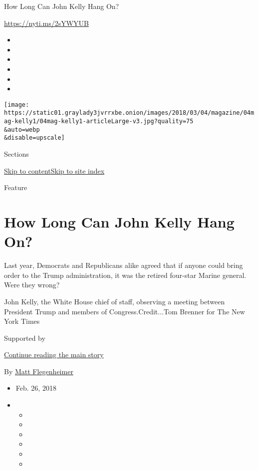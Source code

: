 How Long Can John Kelly Hang On?

\url{https://nyti.ms/2sYWYUB}

\begin{itemize}
\item
\item
\item
\item
\item
\item
\end{itemize}

\texttt{[image: https://static01.graylady3jvrrxbe.onion/images/2018/03/04/magazine/04mag-kelly1/04mag-kelly1-articleLarge-v3.jpg?quality=75\\\&auto=webp\\\&disable=upscale]}

Sections

\protect\hyperlink{site-content}{Skip to
content}\protect\hyperlink{site-index}{Skip to site index}

Feature

\hypertarget{how-long-can-john-kelly-hang-on}{%
\section{How Long Can John Kelly Hang
On?}\label{how-long-can-john-kelly-hang-on}}

Last year, Democrats and Republicans alike agreed that if anyone could
bring order to the Trump administration, it was the retired four-star
Marine general. Were they wrong?

John Kelly, the White House chief of staff, observing a meeting between
President Trump and members of Congress.Credit...Tom Brenner for The New
York Times

Supported by

\protect\hyperlink{after-sponsor}{Continue reading the main story}

By \href{https://www.nytimes3xbfgragh.onion/by/matt-flegenheimer}{Matt
Flegenheimer}

\begin{itemize}
\item
  Feb. 26, 2018
\item
  \begin{itemize}
  \item
  \item
  \item
  \item
  \item
  \item
  \end{itemize}
\end{itemize}

